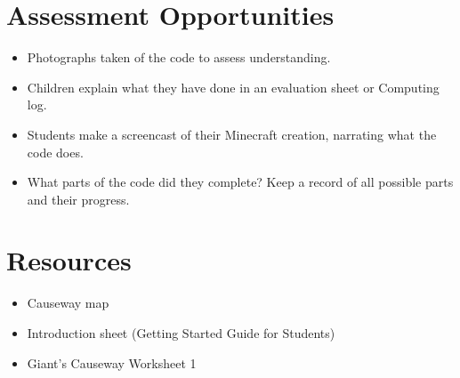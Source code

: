 \documentclass{geocraft-lesson-plan}
\begin{document}
\section*{Assessment Opportunities}
\begin{itemize}
\item Photographs taken of the code to assess understanding. 
\item Children explain what they have done in an evaluation sheet or Computing log.   
\item Students make a screencast of their Minecraft creation, narrating what the code does.
\item What parts of the code did they complete? Keep a record of all possible parts and their progress.
\end{itemize}



\section*{Resources}
\begin{itemize}
\item Causeway map
\item Introduction sheet (Getting Started Guide for Students)
\item Giant’s Causeway Worksheet 1
\end{itemize}

\end{document}
